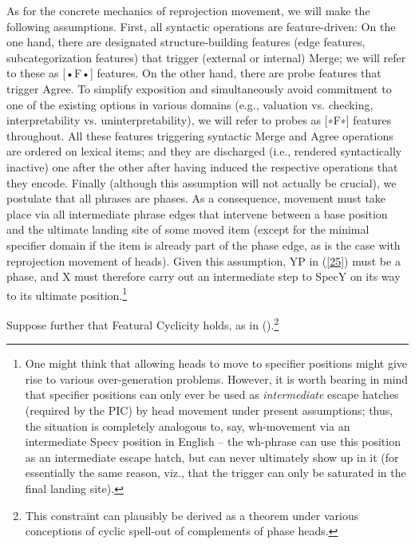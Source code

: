 \documentclass[output=paper
,modfonts
,nonflat]{langsci/langscibook}
\begin{document}
	As for the concrete mechanics of reprojection movement, we will make
	the following assumptions. First,  all syntactic operations are
	feature-driven: On the one hand, there are designated   structure-building features (edge features, subcategorization
	features) that trigger (external or internal) Merge; we will refer to
	these as [•F•] features. On the
	other hand, there are   probe features that trigger Agree. To simplify
	exposition and simultaneously avoid commitment to one of the existing options in
	various domains (e.g., valuation vs. checking, interpretability
	vs. uninterpretability), we will refer to probes as 
	[∗F∗] features throughout.
	All these features triggering syntactic Merge and Agree operations are
	ordered on lexical items; and they are discharged (i.e., rendered
	syntactically inactive) one after the other
	after having induced the respective operations that they encode. 
	Finally (although this assumption will not actually be crucial), we
	postulate that all phrases are phases. As a consequence, movement must take place via all
	intermediate phrase edges  that intervene between a base position and
	the ultimate landing site of some moved item (except for the minimal
	specifier domain if the item is already part of the phase edge, as
	is the case with reprojection movement of heads). Given this
	assumption, YP in (\ref{25}) must be a phase, and X must therefore
	carry out an intermediate step to SpecY on its way to its ultimate
	position.\footnote{One might think that allowing heads to move to
		specifier positions might give rise to various over-generation
		problems. However, it is worth bearing in mind that specifier
		positions can only ever be used as {\itshape intermediate} escape
		hatches (required by the PIC) by head movement under present
		assumptions; thus, the situation is completely analogous to, say,
		wh-movement via an intermediate Specv position in English -- the
		wh-phrase can use this position as an intermediate escape hatch,
		but can never ultimately show up in it (for essentially the same
		reason, viz., that the trigger can only be saturated in the final
		landing site).}
	
	Suppose further that Featural Cyclicity holds, as in
	(\Next).\footnote{This constraint can plausibly be derived as a theorem
		under various conceptions of cyclic spell-out of complements of
		phase heads.}
	
\end{document}
